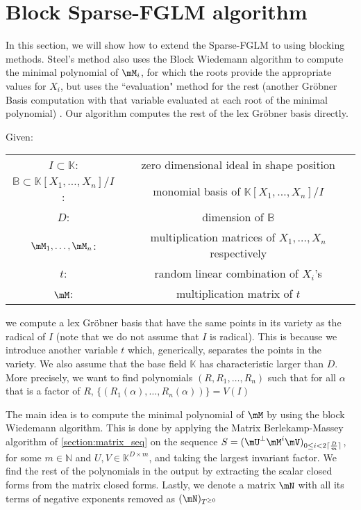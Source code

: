 \documentclass[12pt]{article}
\def\K{\mathbb{K}}
\def\K {\ensuremath{\mathbb{K}}}
\begin{document}
\section{Block Sparse-FGLM algorithm}
In this section, we will show how to extend the Sparse-FGLM
to using blocking methods. Steel's method also uses the
Block Wiedemann algorithm to compute the minimal polynomial
of $\mM_i$, for which the roots provide the appropriate
values for $X_i$,
but uses the ``evaluation" method for the rest
(another Gr\"obner Basis computation with that variable
evaluated at each root of the minimal polynomial) \cite{Steel15}.
Our algorithm computes the rest of the lex
Gr\"obner basis directly.

Given:
\begin{center}
	\begin{tabular}{c c}
		$I \subset \mathbb{K}$:& zero dimensional ideal
		in shape position\\
		$\mathbb{B} \subset \mathbb{K}[X_1,\dots,X_n]/I$:&
		monomial basis of $\mathbb{K}[X_1,\dots,X_n]/I$\\
		$D$: & dimension of $\mathbb{B}$\\
		$\mM_1, \dots,\mM_n$:& multiplication matrices of
		$X_1 ,\dots,X_n$ respectively\\
		$t$:& random linear combination of $X_i$'s\\
		$\mM$:& multiplication matrix of $t$
	\end{tabular}
\end{center}
we compute a lex Gr\"obner basis that have the same points
in its variety as the radical of $I$ 
(note that we do not assume that $I$ is radical).
This is because we introduce another variable $t$ which,
generically, separates the points in the variety.
We also assume that the base field $\K$ has characteristic
larger than $D$. More precisely, we want to find polynomials
$(R,R_1,\dots,R_n)$ such that for all $\alpha$ that is a factor of
$R$, $\{ (R_1(\alpha),\dots,R_n(\alpha)) \} = V(I)$

The main idea is to compute the minimal polynomial
of $\mM$ by using the block Wiedemann algorithm.
This is done by applying the Matrix Berlekamp-Massey algorithm of
\cref{section:matrix_seq} on the sequence 
$S = (\mU^{\perp}\mM^i\mV)_{0 \le i < 2 \lceil \frac{D}{m} \rceil}$,
for some $m \in \mathbb{N}$ and $U,V \in \mathbb{K}^{D \times m}$,
and taking the largest invariant factor.
We find the rest of the polynomials in the output by extracting
the scalar closed forms from the matrix closed forms. Lastly,
we denote a matrix $\mN$ with all its terms of negative exponents removed
as $ (\mN)_{T^{\ge 0}} $
\end{document}
